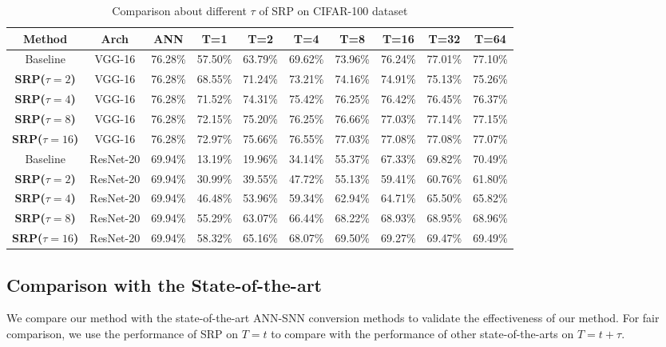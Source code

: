 \documentclass[letterpaper]{article} %
\begin{document}
\begin{table}[]
    \caption{Comparison about different $\tau$ of SRP on CIFAR-100 dataset}
    \renewcommand\arraystretch{1.15}
	\centering
	\begin{tabular}{cccccccccc}\hline
	Method & Arch & ANN & T=1 & T=2 & T=4 & T=8 & T=16 & T=32 & T=64\\ \hline
	Baseline & VGG-16 & 76.28\% & 57.50\% & 63.79\% & 69.62\% & 73.96\% & 76.24\% & 77.01\% & 77.10\% \\\hline
	\textbf{SRP($\tau=2$)} & VGG-16 & 76.28\% & 68.55\% & 71.24\% & 73.21\% & 74.16\% & 74.91\% & 75.13\% & 75.26\% \\ \hline
	\textbf{SRP($\tau=4$)} & VGG-16 & 76.28\% & 71.52\% & 74.31\% & 75.42\% & 76.25\% & 76.42\% & 76.45\% & 76.37\% \\ \hline
	\textbf{SRP($\tau=8$)} & VGG-16 & 76.28\% & 72.15\% & 75.20\% & 76.25\% & 76.66\% & 77.03\% & 77.14\% & 77.15\% \\ \hline
        \textbf{SRP($\tau=16$)} & VGG-16 & 76.28\% & 72.97\% & 75.66\% & 76.55\% & 77.03\% & 77.08\% & 77.08\% & 77.07\% \\ \hline
    Baseline & ResNet-20 & 69.94\% & 13.19\% & 19.96\% & 34.14\% & 55.37\% & 67.33\% & 69.82\% & 70.49\% \\\hline
	\textbf{SRP($\tau=2$)} & ResNet-20 & 69.94\% & 30.99\% & 39.55\% & 47.72\% & 55.13\% & 59.41\% & 60.76\% & 61.80\% \\ \hline
	\textbf{SRP($\tau=4$)} & ResNet-20 & 69.94\% & 46.48\% & 53.96\% & 59.34\% & 62.94\% & 64.71\% & 65.50\% & 65.82\% \\ \hline
	\textbf{SRP($\tau=8$)} & ResNet-20 & 69.94\% & 55.29\% & 63.07\% & 66.44\% & 68.22\% & 68.93\% & 68.95\% & 68.96\% \\ \hline
	\textbf{SRP($\tau=16$)} & ResNet-20 & 69.94\% & 58.32\% & 65.16\% & 68.07\% & 69.50\% & 69.27\% & 69.47\% & 69.49\% \\ \hline
	\end{tabular}
	\label{table06}
\end{table}




\subsection{Comparison with the State-of-the-art}
We compare our method with the state-of-the-art ANN-SNN conversion methods to validate the effectiveness of our method. For fair comparison, we use the performance of SRP on $T=t$ to compare with the performance of other state-of-the-arts on $T=t+\tau$.
\end{document}
